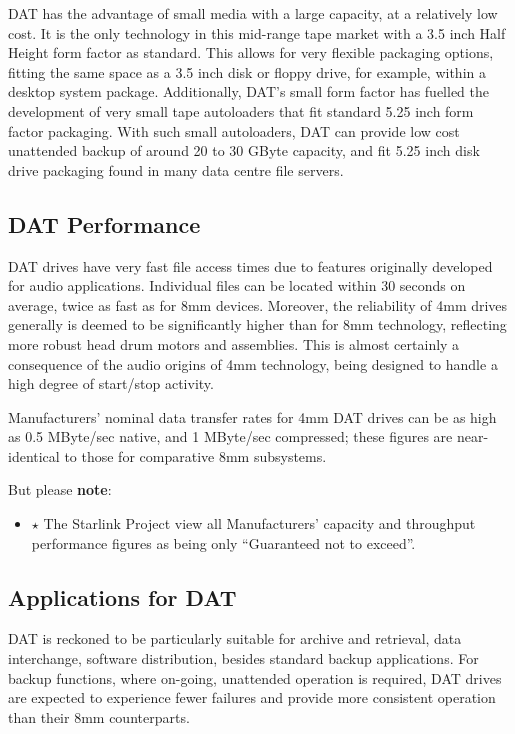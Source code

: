 \documentclass[11pt]{article}
\begin{document}
DAT has the advantage of small media with a large capacity, at a relatively
low cost. It is the only technology in this mid-range tape market with a 3.5
inch Half Height form factor as standard. This allows for very flexible
packaging options, fitting the same space as a 3.5 inch disk or floppy drive,
for example, within a desktop system package. Additionally, DAT's small form
factor has fuelled the development of very small tape autoloaders that fit
standard 5.25 inch form factor packaging. With such small autoloaders, DAT
can provide low cost unattended backup of around 20 to 30 GByte capacity, and
fit 5.25 inch disk drive packaging found in many data centre file servers.

\subsection {DAT Performance}

DAT drives have very fast file access times due to features originally
developed for audio applications. Individual files can be located within
30 seconds on average, twice as fast as for 8mm devices. Moreover, the
reliability of 4mm drives generally is deemed to be significantly higher
than for 8mm technology, reflecting more robust head drum motors and
assemblies. This is almost certainly a consequence of the audio origins of
4mm technology, being designed to handle a high degree of start/stop
activity.

Manufacturers' nominal data transfer rates for 4mm DAT drives can be as high
as 0.5 MByte/sec native, and 1 MByte/sec compressed; these figures are
near-identical to those for comparative 8mm subsystems.

But please {\bf note}:
\begin {itemize}

\item[{\LARGE\bf $\star$}] The Starlink Project view all Manufacturers' capacity
and throughput performance figures as being only ``Guaranteed not to exceed''.

\end {itemize}
\subsection {Applications for DAT}

DAT is reckoned to be particularly suitable for archive and retrieval, data
interchange, software distribution, besides standard backup applications.
For backup functions, where on-going, unattended operation is required, DAT
drives are expected to experience fewer failures and provide more consistent
operation than their 8mm counterparts.
\end{document}
